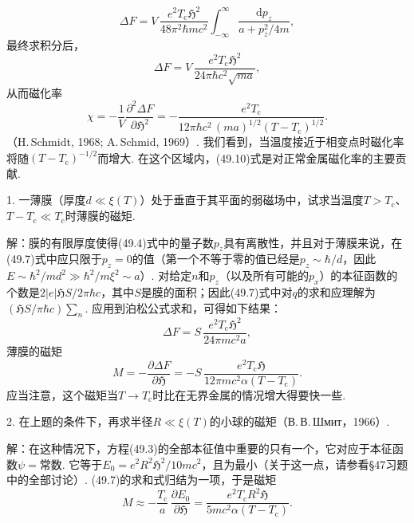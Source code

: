 \begin{equation*}
\Delta F=V\,\frac{e^2T_{\mathrm{c}}\mathfrak{H}^2}{48\pi^2\hbar mc^2}
\int_{-\infty}^{\infty}\frac{\mathrm{d}p_z}{a+p_z^2/4m},
\end{equation*}
最终求积分后，
\begin{equation}
\Delta F=V\,\frac{e^2T_{\mathrm{c}}\mathfrak{H}^2}{24\pi\hbar c^2\sqrt{ma}},
\end{equation}
从而磁化率
\begin{equation}
\chi=-\frac{1}{V}\frac{\partial^2\Delta F}{\partial\mathfrak{H}^2}
=-\frac{e^2T_{\mathrm{c}}}{12\pi\hbar c^2\,(ma)^{1/2}(T-T_{\mathrm{c}})^{1/2}}.
\end{equation}
（H.\,Schmidt, 1968; A.\,Schmid, 1969）. 我们看到，当温度接近于相变点时磁化率将随$(T-T_{\mathrm{c}})^{-1/2}$而增大. 在这个区域内，(49.10)式是对正常金属磁化率的主要贡献.

\begin{xiti}

1. 一薄膜（厚度$d\ll\xi(T)$）处于垂直于其平面的弱磁场中，试求当温度$T>T_{\mathrm{c}}$、$T-T_{\mathrm{c}}\ll T_{\mathrm{c}}$时薄膜的磁矩.

{\heiti 解：}膜的有限厚度使得(49.4)式中的量子数$p_z$具有离散性，并且对于薄膜来说，在(49.7)式中应只限于$p_z=0$的值（第一个不等于零的值已经是$p_z\sim\hbar/d$，因此$E\sim\hbar^2/md^2\gg\hbar^2/m\xi^2\sim a$）. 对给定$n$和$p_z$（以及所有可能的$p_x$）的本征函数的个数是$2|e|\mathfrak{H}S/2\pi\hbar c$，其中$S$是膜的面积；因此(49.7)式中对$q$的求和应理解为$(\mathfrak{H}S/\pi\hbar c)\sum_n$. 应用到泊松公式求和，可得如下结果：
\begin{equation*}
\Delta F=S\,\frac{e^2T_{\mathrm{c}}\mathfrak{H}^2}{24\pi mc^2a},
\end{equation*}
薄膜的磁矩
\begin{equation*}
M=-\frac{\partial\Delta F}{\partial\mathfrak{H}}
=-S\,\frac{e^2T_{\mathrm{c}}\mathfrak{H}}{12\pi mc^2\alpha(T-T_{\mathrm{c}})}.
\end{equation*}
应当注意，这个磁矩当$T\to T_{\mathrm{c}}$时比在无界金属的情况增大得要快一些.

2. 在上题的条件下，再求半径$R\ll\xi(T)$的小球的磁矩（В.\,В.\,Шмит，1966）.

{\heiti 解：}在这种情况下，方程(49.3)的全部本征值中重要的只有一个，它对应于本征函数$\psi=$常数. 它等于$E_0=e^2R^2\mathfrak{H}^2/10mc^2$，且为最小（关于这一点，请参看§47习题中的全部讨论）. (49.7)的求和式归结为一项，于是磁矩
\begin{equation*}
M\approx-\frac{T_{\mathrm{c}}}{a}\,\frac{\partial E_0}{\partial\mathfrak{H}}
=\frac{e^2T_{\mathrm{c}}R^2\mathfrak{H}}{5mc^2\alpha(T-T_{\mathrm{c}})}.
\end{equation*}

\end{xiti}

